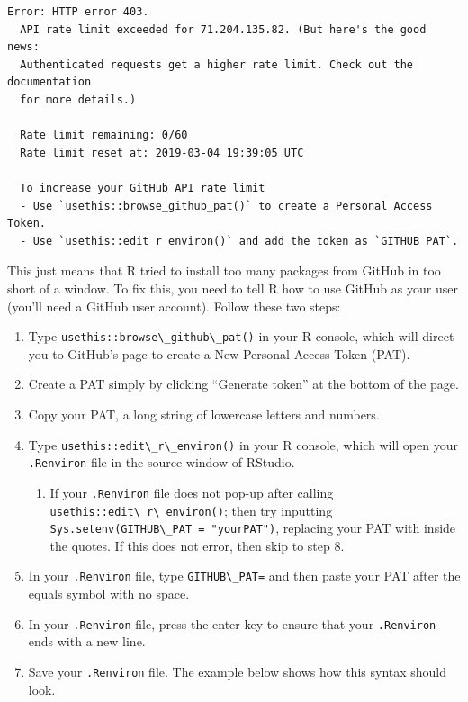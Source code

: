 \documentclass[12pt, krantz2,]{krantz}
\newcommand{\passthrough}[1]{#1}
\providecommand{\tightlist}{%
  \setlength{\itemsep}{0pt}\setlength{\parskip}{0pt}}
\theoremstyle{definition}
\theoremstyle{definition}
\theoremstyle{definition}
\newcommand{\1}{\mathbbm{1}}
\begin{document}
\begin{lstlisting}
Error: HTTP error 403.
  API rate limit exceeded for 71.204.135.82. (But here's the good news:
  Authenticated requests get a higher rate limit. Check out the documentation
  for more details.)

  Rate limit remaining: 0/60
  Rate limit reset at: 2019-03-04 19:39:05 UTC

  To increase your GitHub API rate limit
  - Use `usethis::browse_github_pat()` to create a Personal Access Token.
  - Use `usethis::edit_r_environ()` and add the token as `GITHUB_PAT`.
\end{lstlisting}

This just means that R tried to install too many packages from GitHub in too
short of a window. To fix this, you need to tell R how to use GitHub as your
user (you'll need a GitHub user account). Follow these two steps:

\begin{enumerate}
\def\labelenumi{\arabic{enumi}.}
\item
  Type \passthrough{\lstinline!usethis::browse\_github\_pat()!} in your R console, which will direct
  you to GitHub's page to create a New Personal Access Token (PAT).
\item
  Create a PAT simply by clicking ``Generate token'' at the bottom of the page.
\item
  Copy your PAT, a long string of lowercase letters and numbers.
\item
  Type \passthrough{\lstinline!usethis::edit\_r\_environ()!} in your R console, which will open your
  \passthrough{\lstinline!.Renviron!} file in the source window of RStudio.

  \begin{enumerate}
  \def\labelenumii{\alph{enumii}.}
  \tightlist
  \item
    If your \passthrough{\lstinline!.Renviron!} file does not pop-up after calling
    \passthrough{\lstinline!usethis::edit\_r\_environ()!}; then try inputting
    \passthrough{\lstinline!Sys.setenv(GITHUB\_PAT = "yourPAT")!}, replacing your PAT with inside the
    quotes. If this does not error, then skip to step 8.
  \end{enumerate}
\item
  In your \passthrough{\lstinline!.Renviron!} file, type \passthrough{\lstinline!GITHUB\_PAT=!} and then paste your PAT after
  the equals symbol with no space.
\item
  In your \passthrough{\lstinline!.Renviron!} file, press the enter key to ensure that your \passthrough{\lstinline!.Renviron!}
  ends with a new line.
\item
  Save your \passthrough{\lstinline!.Renviron!} file. The example below shows how this syntax should
  look.
\end{enumerate}
\end{document}
